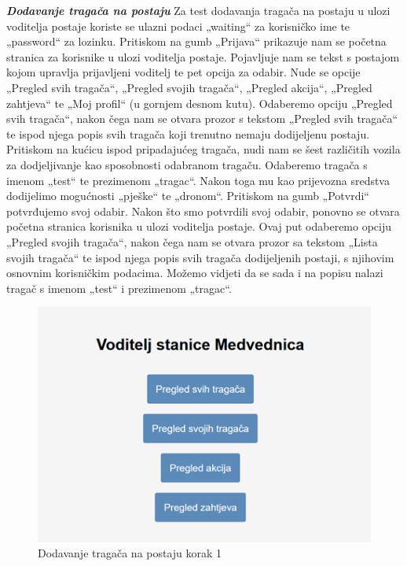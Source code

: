 			\textit{\textbf{Dodavanje tragača na postaju}}
			\newline
			Za test dodavanja tragača na postaju u ulozi voditelja postaje koriste se ulazni 
			podaci „waiting“ za korisničko ime te „password“ za lozinku. Pritiskom na gumb 
			„Prijava“ prikazuje nam se početna stranica za korisnike u ulozi voditelja postaje. 
			Pojavljuje nam se tekst s postajom kojom upravlja prijavljeni voditelj te pet opcija 
			za odabir. Nude se opcije „Pregled svih tragača“, „Pregled svojih tragača“, „Pregled 
			akcija“, „Pregled zahtjeva“ te „Moj profil“ (u gornjem desnom kutu). Odaberemo opciju 
			„Pregled svih tragača“, nakon čega nam se otvara prozor s tekstom „Pregled svih tragača“ 
			te ispod njega popis svih tragača koji trenutno nemaju dodijeljenu postaju. 
			Pritiskom na kućicu ispod pripadajućeg tragača, nudi nam se šest različitih 
			vozila za dodjeljivanje kao sposobnosti odabranom tragaču. Odaberemo tragača s 
			imenom „test“ te prezimenom „tragac“. Nakon toga mu kao prijevozna sredstva dodijelimo 
			mogućnosti „pješke“ te „dronom“. Pritiskom na gumb „Potvrdi“ potvrđujemo svoj odabir. 
			Nakon što smo potvrdili svoj odabir, ponovno se otvara početna stranica korisnika u ulozi 
			voditelja postaje. Ovaj put odaberemo opciju „Pregled svojih tragača“, nakon čega nam se  
			otvara prozor sa tekstom „Lista svojih tragača“ te ispod njega popis svih tragača 
			dodijeljenih postaji, s njihovim osnovnim korisničkim podacima. Možemo vidjeti da se 
			sada i na popisu nalazi tragač s imenom „test“ i prezimenom „tragac“.



			\begin{figure}[H]
				\includegraphics[scale=0.8]{slike/Dodavanje tragača na postaju korak 1.png}
				\centering
				\caption{Dodavanje tragača na postaju korak 1}
				\label{fig:Dodavanje tragača na postaju korak 1}
			\end{figure}

